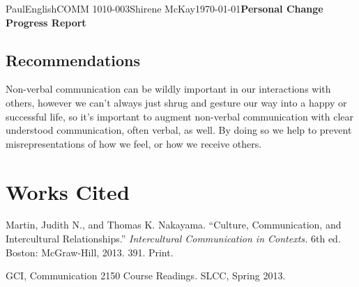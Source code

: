 \documentclass[12pt,letterpaper]{article}
\begin{document}
\begin{mla}{Paul}{English}{COMM 1010-003}{Shirene
    McKay}{\today}{\textbf{Personal Change Progress Report}}
\subsection{Recommendations}
Non-verbal communication can be wildly important in our interactions
with others, however we can't always just shrug and gesture our way
into a happy or successful life, so it's important to augment
non-verbal communication with clear understood communication, often
verbal, as well. By doing so we help to prevent misrepresentations of
how we feel, or how we receive others.

\pagebreak
\section{Works Cited}

\bibent
Martin, Judith N., and Thomas K. Nakayama. ``Culture,
Communication, and Intercultural Relationships.''
\textit{Intercultural Communication in Contexts.} 6th ed. Boston: 
McGraw-Hill, 2013. 391. Print.

\bibent
GCI, Communication 2150 Course Readings. SLCC, Spring 2013.

\end{mla}
\end{document}
